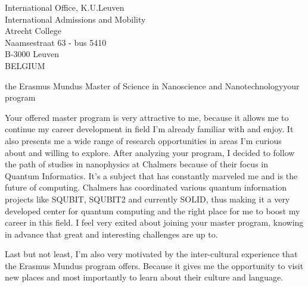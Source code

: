 \documentclass[12pt]{letter}
\begin{document}
\begin{letter}{International Office, K.U.Leuven\\
International Admissions and Mobility\\
Atrecht College\\
Naamsestraat 63 - bus 5410\\
B-3000 Leuven\\
BELGIUM}

\begin{content}{the Erasmus Mundus Master of Science in Nanoscience and Nanotechnology}{your program}

Your offered master program is very attractive to me, because it allows me to continue
my career development in field I'm already familiar with and enjoy. It also presents me
a wide range of research opportunities in areas I'm curious about and willing to explore.
After analyzing your program, I decided to follow the path of studies in nanophysics at
Chalmers because of their focus in Quantum Informatics. It's a subject that has constantly
marveled me and is the future of computing. Chalmers has coordinated various quantum
information projects like SQUBIT, SQUBIT2 and currently SOLID, thus making it a very developed center for quantum computing and the right place for me to boost my career in this field.
I feel very exited about joining your master program, knowing in advance that great and
interesting challenges are up to.

Last but not least, I'm also very motivated by the inter-cultural experience
that the Erasmus Mundus program offers. Because it gives me the opportunity
to visit new places and most importantly to learn about their culture and
language.

\end{content}

\end{letter}
\end{document}

